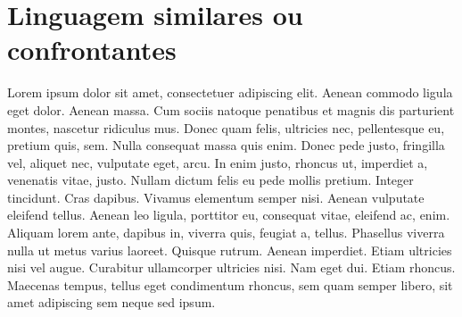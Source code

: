 \chapter{Linguagem similares ou confrontantes}

  Lorem ipsum dolor sit amet, consectetuer adipiscing 
  elit. Aenean commodo ligula eget dolor. Aenean massa.
  Cum sociis natoque penatibus et magnis dis parturient
  montes, nascetur ridiculus mus. Donec quam felis, 
  ultricies nec, pellentesque eu, pretium quis, sem. 
  Nulla consequat massa quis enim. Donec pede justo, 
  fringilla vel, aliquet nec, vulputate eget, arcu. In 
  enim justo, rhoncus ut, imperdiet a, venenatis vitae,
  justo. Nullam dictum felis eu pede mollis pretium. 
  Integer tincidunt. Cras dapibus. Vivamus elementum 
  semper nisi. Aenean vulputate eleifend tellus. Aenean 
  leo ligula, porttitor eu, consequat vitae, eleifend 
  ac, enim. Aliquam lorem ante, dapibus in, viverra 
  quis, feugiat a, tellus. Phasellus viverra nulla ut 
  metus varius laoreet. Quisque rutrum. Aenean imperdiet.
  Etiam ultricies nisi vel augue. Curabitur ullamcorper 
  ultricies nisi. Nam eget dui. Etiam rhoncus. Maecenas 
  tempus, tellus eget condimentum rhoncus, sem quam 
  semper libero, sit amet adipiscing sem neque sed ipsum.

\newpage